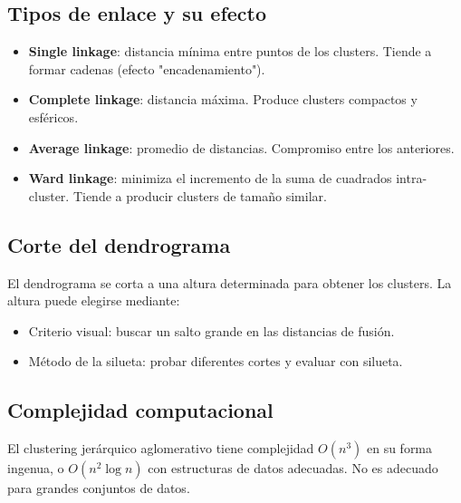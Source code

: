 \documentclass[12pt,a4paper,openany,oneside]{book}
\begin{document}
\subsection{Tipos de enlace y su efecto}
\begin{itemize}
    \item \textbf{Single linkage}: distancia mínima entre puntos de los clusters. Tiende a formar cadenas (efecto "encadenamiento").
    \item \textbf{Complete linkage}: distancia máxima. Produce clusters compactos y esféricos.
    \item \textbf{Average linkage}: promedio de distancias. Compromiso entre los anteriores.
    \item \textbf{Ward linkage}: minimiza el incremento de la suma de cuadrados intra-cluster. Tiende a producir clusters de tamaño similar.
\end{itemize}

\begin{center}
\caption{Diferentes tipos de enlace producirían distintas particiones.}
\end{center}

\subsection{Corte del dendrograma}
El dendrograma se corta a una altura determinada para obtener los clusters. La altura puede elegirse mediante:
\begin{itemize}
    \item Criterio visual: buscar un salto grande en las distancias de fusión.
    \item Método de la silueta: probar diferentes cortes y evaluar con silueta.
\end{itemize}

\subsection{Complejidad computacional}
El clustering jerárquico aglomerativo tiene complejidad \(O(n^3)\) en su forma ingenua, o \(O(n^2 \log n)\) con estructuras de datos adecuadas. No es adecuado para grandes conjuntos de datos.
\end{document}

